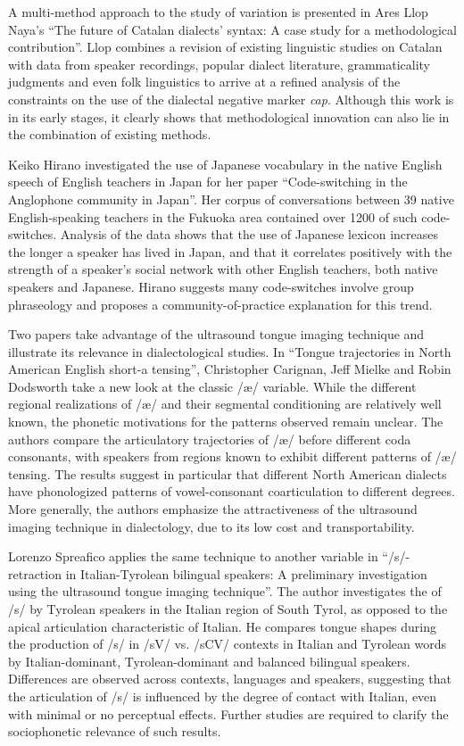 \documentclass[output=paper]{LSP/langsci}
\begin{document}
A multi-method approach to the study of variation is presented in Ares Llop Naya’s “The future of Catalan dialects’ syntax: A case study for a methodological contribution”. Llop combines a revision of existing linguistic studies on Catalan with data from speaker recordings, popular dialect literature, grammaticality judgments and even folk linguistics to arrive at a refined analysis of the constraints on the use of the dialectal negative marker \textit{cap}. Although this work is in its early stages, it clearly shows that methodological innovation can also lie in the combination of existing methods.

Keiko Hirano investigated the use of Japanese vocabulary in the native English speech of English teachers in Japan for her paper “Code-switching in the Anglophone community in Japan”. Her corpus of conversations between 39 native English-speaking teachers in the Fukuoka area contained over 1200 of such code-switches. Analysis of the data shows that the use of Japanese lexicon increases the longer a speaker has lived in Japan, and that it correlates positively with the strength of a speaker’s social network with other English teachers, both native speakers and Japanese. Hirano suggests many code-switches involve group phraseology and proposes a community-of-practice explanation for this trend.

Two papers take advantage of the ultrasound tongue imaging technique and illustrate its relevance in dialectological studies. In “Tongue trajectories in North American English short-a tensing”, Christopher Carignan, Jeff Mielke and Robin Dodsworth take a new look at the classic /æ/ variable. While the different regional realizations of /æ/ and their segmental conditioning are relatively well known, the phonetic motivations for the patterns observed remain unclear. The authors compare the articulatory trajectories of /æ/ before different coda consonants, with speakers from regions known to exhibit different patterns of /æ/ tensing. The results suggest in particular that different North American dialects have phonologized patterns of vowel-consonant coarticulation to different degrees. More generally, the authors emphasize the attractiveness of the ultrasound imaging technique in dialectology, due to its low cost and transportability.

Lorenzo Spreafico applies the same technique to another variable in “/s/-retrac\-tion in Italian-Tyrolean bilingual speakers: A preliminary investigation using the ultrasound tongue imaging technique”. The author investigates the 
of /s/ by Tyrolean speakers in the Italian region of South Tyrol, as opposed to the apical articulation characteristic of Italian. He compares tongue shapes during the production of /s/ in /sV/ vs. /sCV/ contexts in Italian and Tyrolean words by Italian-dominant, Tyrolean-dominant and balanced bilingual speakers. Differences are observed across contexts, languages and speakers, suggesting that the articulation of /s/ is influenced by the degree of contact with Italian, even with minimal or no perceptual effects. Further studies are required to clarify the sociophonetic relevance of such results. 
\end{document}
